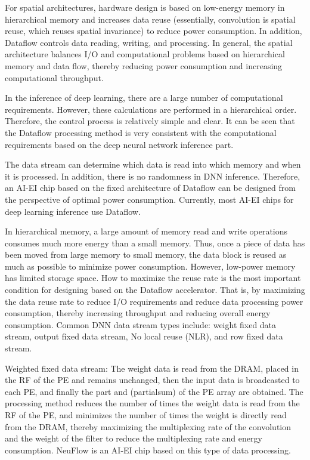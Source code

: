\documentclass[UTF8,12pt,a4paper]{article}
\begin{document}
For spatial architectures, hardware design is based on
low-energy memory in hierarchical memory and increases data reuse
(essentially, convolution is spatial reuse, which reuses spatial invariance) to reduce power consumption.
In addition, Dataflow controls data reading, writing, and processing.
In general, the spatial architecture balances I/O and computational problems
based on hierarchical memory and data flow,
thereby reducing power consumption and increasing computational throughput.

In the inference of deep learning, there are a large number of computational requirements.
However, these calculations are performed in a hierarchical order.
Therefore, the control process is relatively simple and clear.
It can be seen that the Dataflow processing method is very consistent
with the computational requirements based on the deep neural network inference part.

The data stream can determine which data is read into which memory and when it is processed.
In addition, there is no randomness in DNN inference.
Therefore, an AI-EI chip based on the fixed architecture of Dataflow
can be designed from the perspective of optimal power consumption.
Currently, most AI-EI chips for deep learning inference use Dataflow.

In hierarchical memory, a large amount of memory read and write operations
consumes much more energy than a small memory.
Thus, once a piece of data has been moved from large memory to small memory,
the data block is reused as much as possible to minimize power consumption.
However, low-power memory has limited storage space.
How to maximize the reuse rate is the most important condition
for designing based on the Dataflow accelerator.
That is, by maximizing the data reuse rate to reduce I/O requirements
and reduce data processing power consumption,
thereby increasing throughput and reducing overall energy consumption.
Common DNN data stream types include: weight fixed data stream, output fixed data stream, No local reuse (NLR), and row fixed data stream.

Weighted fixed data stream: The weight data is read from the DRAM,
placed in the RF of the PE and remains unchanged,
then the input data is broadcasted to each PE,
and finally the part and (partialsum) of the PE array are obtained.
The processing method reduces the number of times the weight data is read from the RF of the PE,
and minimizes the number of times the weight is directly read from the DRAM,
thereby maximizing the multiplexing rate of the convolution
and the weight of the filter to reduce the multiplexing rate and energy consumption.
NeuFlow is an AI-EI chip based on this type of data processing.
\end{document}
